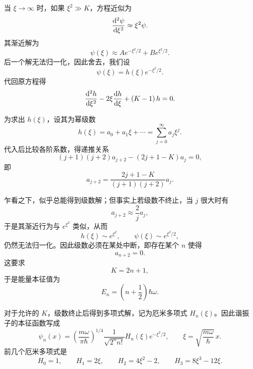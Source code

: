 当 \(\xi\to\infty\) 时，如果 \(\xi^2\gg K\)，方程近似为
\begin{equation}
    \dv[2]{\psi}{\xi}\approx \xi^2\psi.
\end{equation}
其渐近解为
\begin{equation}
    \psi(\xi)\approx Ae^{-\xi^2/2}+Be^{\xi^2/2}.
\end{equation}
后一个解无法归一化，因此舍去，我们设
\begin{equation}
    \psi(\xi)=h(\xi)e^{-\xi^2/2}.
\end{equation}
代回原方程得
\begin{equation}
    \dv[2]{h}{\xi}-2\xi \dv{h}{\xi}+\left( K-1 \right)h=0.
\end{equation}

为求出 \(h(\xi)\)，设其为幂级数
\begin{equation}
    h(\xi)=a_0+a_1\xi+\cdots=\sum_{j=0}^{\infty}a_j\xi^j.
\end{equation}
代入后比较各阶系数，得递推关系
\begin{equation}
    \left( j+1 \right)\left( j+2 \right)a_{j+2}-\left( 2j+1-K \right)a_j=0,
\end{equation}
即
\begin{equation}
    a_{j+2}=\frac{2j+1-K}{\left( j+1 \right)\left( j+2 \right)}a_j.
\end{equation}

乍看之下，似乎总能得到级数解；但事实上若级数不终止，当 \(j\) 很大时有
\begin{equation}
    a_{j+2}\approx \frac{2}{j}a_j,
\end{equation}
于是其渐近行为与 \(e^{\xi^2}\) 类似，从而
\begin{equation}
    h(\xi)\sim e^{\xi^2},
    \qquad
    \psi(\xi)\sim e^{\xi^2/2},
\end{equation}
仍然无法归一化。因此级数必须在某处中断，即存在某个 \(n\) 使得
\begin{equation}
    a_{n+2}=0.
\end{equation}
这要求
\begin{equation}
    K=2n+1,
\end{equation}
于是能量本征值为
\begin{equation}
    E_n=\left( n+\frac{1}{2} \right)\hbar\omega.
\end{equation}

对于允许的 \(K\)，级数终止后得到多项式解，记为厄米多项式 \(H_n(\xi)\)。因此谐振子的本征函数写成
\begin{equation}
    \psi_n(x)
    =
    \left( \frac{m\omega}{\pi\hbar} \right)^{1/4}
    \frac{1}{\sqrt{2^n n!}}
    H_n(\xi)e^{-\xi^2/2},
    \qquad
    \xi=\sqrt{\frac{m\omega}{\hbar}}\,x.
\end{equation}
前几个厄米多项式是
\begin{equation}
    H_0=1,
    \qquad
    H_1=2\xi,
    \qquad
    H_2=4\xi^2-2,
    \qquad
    H_3=8\xi^3-12\xi.
\end{equation}

